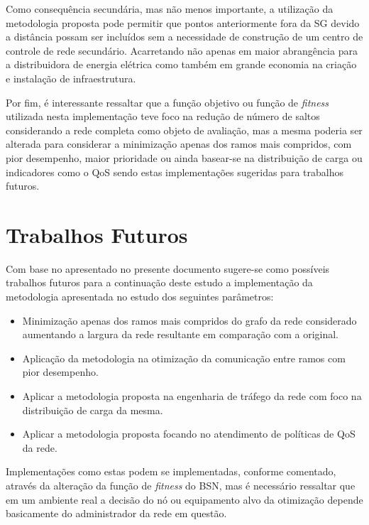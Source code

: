 Como consequência secundária, mas não menos importante, a utilização da metodologia proposta pode permitir que pontos anteriormente fora da SG devido a distância possam ser incluídos sem a necessidade de construção de um centro de controle de rede secundário. Acarretando não apenas em maior abrangência para a distribuidora de energia elétrica como também em grande economia na criação e instalação de infraestrutura.

Por fim, é interessante ressaltar que a função objetivo ou função de \emph{fitness} utilizada nesta implementação teve foco na redução de número de saltos considerando a rede completa como objeto de avaliação, mas a mesma poderia ser alterada para considerar a minimização apenas dos ramos mais compridos, com pior desempenho, maior prioridade ou ainda basear-se na distribuição de carga ou indicadores como o QoS sendo estas implementações sugeridas para trabalhos futuros.

\section{Trabalhos Futuros}
Com base no apresentado no presente documento sugere-se como possíveis trabalhos futuros para a continuação deste estudo a implementação da metodologia apresentada no estudo dos seguintes parâmetros:
\begin{itemize}
	\item Minimização apenas dos ramos mais compridos do grafo da rede considerado aumentando a largura da rede resultante em comparação com a original.
	\item Aplicação da metodologia na otimização da comunicação entre ramos com pior desempenho.
	\item Aplicar a metodologia proposta na engenharia de tráfego da rede com foco na distribuição de carga da mesma.
	\item Aplicar a metodologia proposta focando no atendimento de políticas de QoS da rede.
\end{itemize}

Implementações como estas podem se implementadas, conforme comentado, através da alteração da função de \emph{fitness} do BSN, mas é necessário ressaltar que em um ambiente real a decisão do nó ou equipamento alvo da otimização depende basicamente do administrador da rede em questão.


